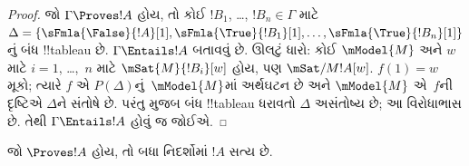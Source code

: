\documentclass[../../../include/open-logic-section]{subfiles}
\begin{document}
\begin{proof}
  જો $\Gamma \Proves !A$ હોય, તો કોઈ
  $!B_1$, \dots, $!B_n \in \Gamma$ માટે
  $\Delta = \{\sFmla{\False}{!A}[1],
  \sFmla{\True}{!B_1}[1], \dots,
  \sFmla{\True}{!B_n}[1]\}$નું બંધ
  !!{tableau} છે. $\Gamma \Entails !A$
  બતાવવું છે. ઊલટું ધારો: કોઈ
  $\mModel{M}$ અને $w$ માટે $i=1$,
  \dots,~$n$ માટે $\mSat{M}{!B_i}[w]$
  હોય, પણ $\mSat/{M}{!A}[w]$.
  $f(1) = w$ મૂકો; ત્યારે $f$ એ
  $P(\Delta)$નું~$\mModel{M}$માં અર્થઘટન
  છે અને $\mModel{M}$ એ~$f$ની દૃષ્ટિએ
  $\Delta$ને સંતોષે છે. પરંતુ
   મુજબ બંધ
  !!{tableau} ધરાવતો $\Delta$ અસંતોષ્ય છે;
  આ વિરોધાભાસ છે. તેથી
  $\Gamma \Entails !A$ હોવું જ જોઈએ.
\end{proof}

\begin{cor}
જો $\Proves !A$ હોય, તો બધા નિદર્શોમાં
$!A$ સત્ય છે.
\end{cor}
\end{document}
